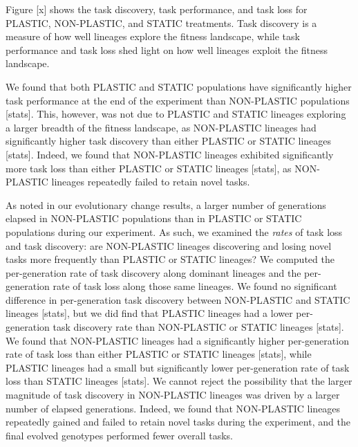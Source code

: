 Figure [x] shows the task discovery, task performance, and task loss for PLASTIC, NON-PLASTIC, and STATIC treatments.
Task discovery is a measure of how well lineages explore the fitness landscape, while task performance and task loss shed light on how well lineages exploit the fitness landscape. 

We found that both PLASTIC and STATIC populations have significantly higher task performance at the end of the experiment than NON-PLASTIC populations [stats].
This, however, was not due to PLASTIC and STATIC lineages exploring a larger breadth of the fitness landscape, as NON-PLASTIC lineages had significantly higher task discovery than either PLASTIC or STATIC lineages [stats].
Indeed, we found that NON-PLASTIC lineages exhibited significantly more task loss than either PLASTIC or STATIC lineages [stats], as NON-PLASTIC lineages repeatedly failed to retain novel tasks.

As noted in our evolutionary change results, a larger number of generations elapsed in NON-PLASTIC populations than in PLASTIC or STATIC populations during our experiment.
As such, we examined the \textit{rates} of task loss and task discovery: are NON-PLASTIC lineages discovering and losing novel tasks more frequently than PLASTIC or STATIC lineages?
We computed the per-generation rate of task discovery along dominant lineages and the per-generation rate of task loss along those same lineages.
We found no significant difference in per-generation task discovery between NON-PLASTIC and STATIC lineages [stats], but we did find that PLASTIC lineages had a lower per-generation task discovery rate than NON-PLASTIC or STATIC lineages [stats].
We found that NON-PLASTIC lineages had a significantly higher per-generation rate of task loss than either PLASTIC or STATIC lineages [stats], while PLASTIC lineages had a small but significantly lower per-generation rate of task loss than STATIC lineages [stats].
We cannot reject the possibility that the larger magnitude of task discovery in NON-PLASTIC lineages was driven by a larger number of elapsed generations.
Indeed, we found that NON-PLASTIC lineages repeatedly gained and failed to retain novel tasks during the experiment, and the final evolved genotypes performed fewer overall tasks.

